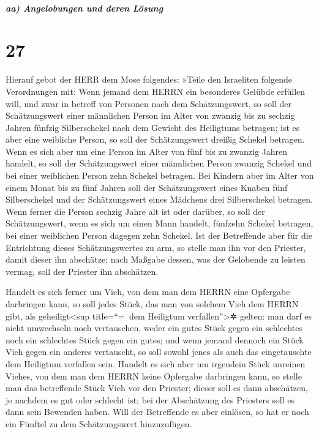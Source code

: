 \hypertarget{aa-angelobungen-und-deren-luxf6sung}{%
\subparagraph{aa) Angelobungen und deren
Lösung}\label{aa-angelobungen-und-deren-luxf6sung}}

\hypertarget{section-26}{%
\section{27}\label{section-26}}

Hierauf gebot der HERR dem Mose folgendes:
»Teile den Israeliten folgende Verordnungen mit: Wenn
jemand dem HERRN ein besonderes Gelübde erfüllen will, und zwar in
betreff von Personen nach dem Schätzungswert, so soll der
Schätzungswert einer männlichen Person im Alter von zwanzig bis zu
sechzig Jahren fünfzig Silberschekel nach dem Gewicht des Heiligtums
betragen; ist es aber eine weibliche Person, so soll der
Schätzungswert dreißig Schekel betragen. Wenn es sich aber
um eine Person im Alter von fünf bis zu zwanzig Jahren handelt, so soll
der Schätzungswert einer männlichen Person zwanzig Schekel und bei einer
weiblichen Person zehn Schekel betragen. Bei Kindern aber
im Alter von einem Monat bis zu fünf Jahren soll der Schätzungswert
eines Knaben fünf Silberschekel und der Schätzungswert eines Mädchens
drei Silberschekel betragen. Wenn ferner die Person
sechzig Jahre alt ist oder darüber, so soll der Schätzungswert, wenn es
sich um einen Mann handelt, fünfzehn Schekel betragen, bei einer
weiblichen Person dagegen zehn Schekel. Ist der
Betreffende aber für die Entrichtung dieses Schätzungswertes zu arm, so
stelle man ihn vor den Priester, damit dieser ihn abschätze; nach
Maßgabe dessen, was der Gelobende zu leisten vermag, soll der Priester
ihn abschätzen.

Handelt es sich ferner um Vieh, von dem man dem HERRN eine
Opfergabe darbringen kann, so soll jedes Stück, das man von solchem Vieh
dem HERRN gibt, als geheiligt\textless sup title=``=~dem Heiligtum
verfallen''\textgreater✲ gelten: man darf es nicht
umwechseln noch vertauschen, weder ein gutes Stück gegen ein schlechtes
noch ein schlechtes Stück gegen ein gutes; und wenn jemand dennoch ein
Stück Vieh gegen ein anderes vertauscht, so soll sowohl jenes als auch
das eingetauschte dem Heiligtum verfallen sein. Handelt
es sich aber um irgendein Stück unreinen Viehes, von dem man dem HERRN
keine Opfergabe darbringen kann, so stelle man das betreffende Stück
Vieh vor den Priester; dieser soll es dann abschätzen, je
nachdem es gut oder schlecht ist; bei der Abschätzung des Priesters soll
es dann sein Bewenden haben. Will der Betreffende es aber
einlösen, so hat er noch ein Fünftel zu dem Schätzungswert hinzuzufügen.

